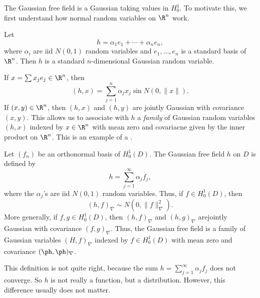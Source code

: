 \documentclass[a4paper]{article}
\begin{document}
The Gaussian free field is a Gaussian taking values in $H_0^1$. To motivate this, we first understand how normal random variables on $\R^n$ work.

Let
\[
  h = \alpha_1 e_1 + \cdots + \alpha_n e_n,
\]
where $\alpha_i$ are iid $N(0, 1)$ random variables and $e_1, \ldots, e_n$ is a standard basis of $\R^n$. Then $h$ is a standard $n$-dimensional Gaussian random variable.

If $x = \sum x_j e_j \in \R^n$, then
\[
  (h, x) = \sum_{j = 1}^n \alpha_j x_j \sin N(0, \|x\|).
\]
If $(x, y) \in \R^n$, then $(h, x)$ and $(h, y)$ are jointly Gaussian with covariance $(x, y)$. This allows us to associate with $h$ a \emph{family} of Gaussian random variables $(h, x)$ indexed by $x \in \R^n$ with mean zero and covariacne given by the inner product on $\R^n$. This is an example of a .

Let $(f_n)$ be an orthonormal basis of $H_0^1(D)$. The Gaussian free field $h$ on $D$ is defined by 
\[
  h = \sum_{j = 1}^\infty \alpha_j f_j,
\]
where the $\alpha_j$'s are iid $N(0, 1)$ random variables. Thus, if $f \in H_0^1(D)$, then
\[
  (h, f)_\nabla \sim N(0, \|f\|_\nabla^2).
\]
More generally, if $f, g \in H_0^1(D)$, then $(h, f)_\nabla$ and $(h, g)_\nabla$ arejointly Gaussian with covariance $(f, g)_\nabla$. Thus, the Gaussian free field is a family of Gaussian variables $(H, f)_\nabla$ indexed by $f \in H_0^1(D)$ with mean zero and covariance $(\ph, \ph)_\nabla$.

This definition is not quite right, because the sum $h = \sum_{j = 1}^\infty \alpha_j f_j$ does not converge. So $h$ is not really a function, but a distribution. However, this difference usually does not matter.
\end{document}
